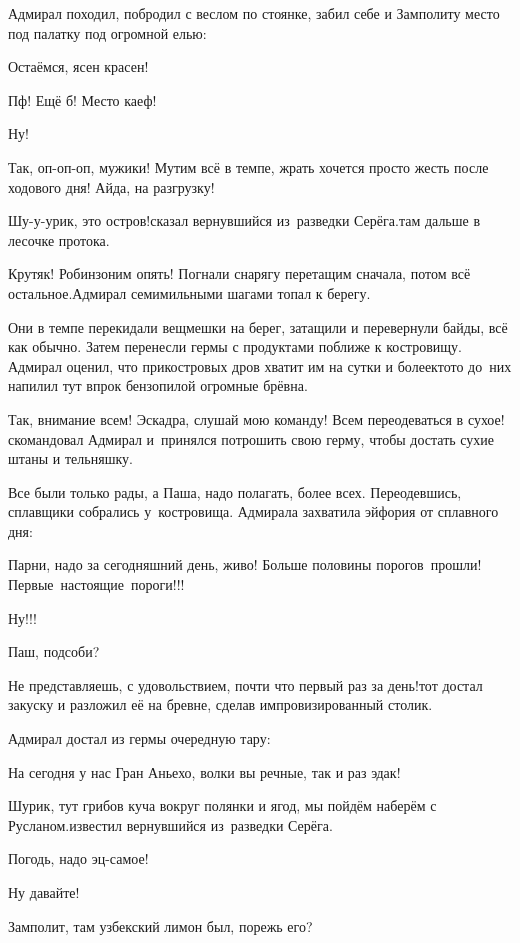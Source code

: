 Адмирал походил, побродил с веслом по стоянке, забил себе и Замполиту место под палатку под огромной елью:

\diagdash Остаёмся, ясен красен!

\diagdash Пф! Ещё б! Место каеф!

\diagdash Ну!

\diagdash Так, оп-оп-оп, мужики! Мутим всё в темпе, жрать хочется просто жесть после ходового дня! Айда, на разгрузку!

\diagdash Шу-у-урик, это остров!\mdash сказал вернувшийся из~разведки Серёга.\mdash там дальше в лесочке протока.

\diagdash Крутяк! Робинзоним опять! Погнали снарягу перетащим сначала, потом всё остальное.\mdash Адмирал семимильными шагами топал к берегу.

Они в темпе перекидали вещмешки на берег, затащили и перевернули байды, всё как обычно. Затем перенесли гермы с продуктами поближе к костровищу. Адмирал оценил, что прикостровых дров хватит им на сутки и более\mdash кто\sdash то до~них напилил тут впрок бензопилой огромные брёвна.

\diagdash Так, внимание всем! Эскадра, слушай мою команду! Всем переодеваться в сухое!\mdash скомандовал Адмирал и~принялся потрошить свою герму, чтобы достать сухие штаны и тельняшку.

Все были только рады, а Паша, надо полагать, более всех. Переодевшись, сплавщики собрались у~костровища. Адмирала захватила эйфория от сплавного дня:

\diagdash Парни, надо за сегодняшний день, живо! Больше половины порогов~прошли! Первые~настоящие~пороги!!!%

\diagdash Ну!!!

\diagdash Паш, подсоби?

\diagdash Не представляешь, с удовольствием, почти что первый раз за день!\mdash тот достал закуску и разложил её на бревне, сделав импровизированный столик.

Адмирал достал из гермы очередную тару:

\diagdash На сегодня у нас Гран Аньехо, волки вы речные, так и раз эдак!

\diagdash Шурик, тут грибов куча вокруг полянки и ягод, мы пойдём наберём с Русланом.\mdash известил вернувшийся из~разведки Серёга.

\diagdash Погодь, надо эц-самое!

\diagdash Ну давайте!

\diagdash Замполит, там узбекский лимон был, порежь его?

